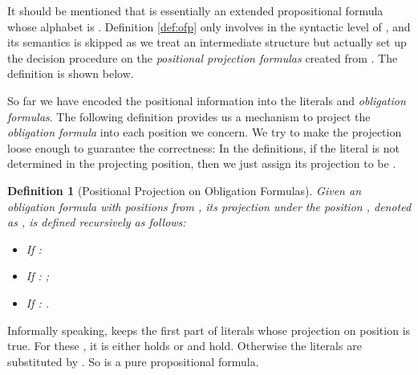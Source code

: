 \documentclass[conference]{IEEEtran}
\newtheorem{definition}{Definition}
\begin{document}
It should be mentioned that  is essentially an extended propositional formula whose alphabet is 
. Definition 
\ref{def:ofp} only involves in the syntactic level of , and its semantics is skipped as 
we treat  an intermediate structure but actually set up the decision procedure on the \textit{positional projection formulas} 
created from . The definition is shown below. 

So far we have encoded the positional information into the literals and \textit{obligation formulas}. 
The following definition provides us a mechanism to project the \textit{obligation formula} into each position we 
concern. We try to make the projection loose enough to guarantee the correctness: In the definitions, if 
the literal is not determined in the projecting position, then we just assign 
its projection to be .

\iffalse
\begin{definition}[Positional Projection on Literals]\label{def:literal_projection}
    Let , then we denote  as 
    's projection under the position , and we define  iff 
    1). , or 2).  and . Otherwise we define 
\end{definition}

The projection on a literal tells us whether the literal needs to be satisfied at the given position. For example, 
consider the formula  and thus . 
Let  and , then according to 
Definition \ref{def:literal_projection} we have , 
 (since ) and  for every  (since  and 
). Note also  for all , and it is because  which is 
undetermined so that its projection for every position is . Next, we extend the projection to the obligation formula:
\fi
  
\begin{definition}[Positional Projection on Obligation Formulas]\label{def:ofp_projection}
    Given an obligation formula with positions  from , its projection under the 
    position , denoted 
    as , is defined recursively as follows:
    \begin{itemize}
      \item If : 
      \item If : ;
      \item If : .
    \end{itemize}
\end{definition}

Informally speaking,  keeps the first part of literals whose projection on position  is true. For these , it is either  holds or  and  hold. Otherwise the literals are substituted  
by . So  is a pure propositional formula. 
\end{document}

